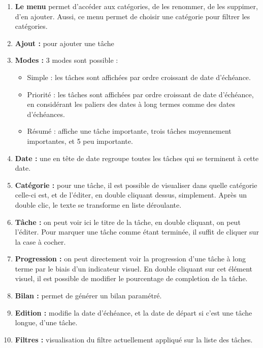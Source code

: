 \documentclass{article}
\begin{document}
		\begin{enumerate}
			\item \textbf{Le menu} permet d'accéder aux catégories, de les renommer, de les suppimer, d'en ajouter. Aussi, ce menu permet de choisir une catégorie pour filtrer les catégories.
			\item \textbf{Ajout :} pour ajouter une tâche
			\item \textbf{Modes : }3 modes sont possible :
			\begin{itemize}
				\item Simple : les tâches sont affichées par ordre croissant de date d'échéance.
				\item Priorité : les tâches sont affichées par ordre croissant de date d'échéance, en considérant les paliers des dates à long termes comme des dates d'échéances.
				\item Résumé : affiche une tâche importante, trois tâches moyennement importantes, et 5 peu importante.
			\end{itemize} 
			\item \textbf{Date : }une en tête de date regroupe toutes les tâches qui se terminent à cette date.
			\item \textbf{Catégorie : } pour une tâche, il est possible de visualiser dans quelle catégorie celle-ci est, et de l'éditer, en double cliquant dessus, simplement. Après un double clic, le texte se transforme en liste déroulante.
			\item \textbf{Tâche : }on peut voir ici le titre de la tâche, en double cliquant, on peut l'éditer. Pour marquer une tâche comme étant terminée, il suffit de cliquer sur la case à cocher.
			\item \textbf{Progression : }on peut directement voir la progression d'une tâche à long terme par le biais d'un indicateur visuel. En double cliquant sur cet élément visuel, il est possible de modifier le pourcentage de completion de la tâche.
			\item \textbf{Bilan : }permet de générer un bilan paramétré.
			\item \textbf{Edition : }modifie la date d'échéance, et la date de départ si c'est une tâche longue, d'une tâche.
			\item \textbf{Filtres : }visualisation du filtre actuellement appliqué sur la liste des tâches.
		\end{enumerate}
\end{document}
